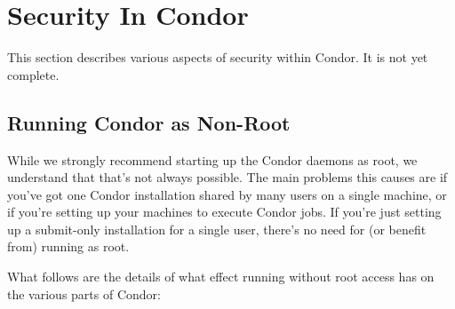 \section{\label{sec:Security}Security In Condor}

This section describes various aspects of security within Condor.
It is not yet complete.

\subsection{\label{sec:Non-Root}Running Condor as Non-Root}

While we strongly recommend starting up the Condor daemons as root, we
understand that that's not always possible.  The main problems this
causes are if you've got one Condor installation shared by many users
on a single machine, or if you're setting up your machines to execute
Condor jobs.  If you're just setting up a submit-only installation for
a single user, there's no need for (or benefit from) running as
root.  

What follows are the details of what effect running without root
access has on the various parts of Condor:

